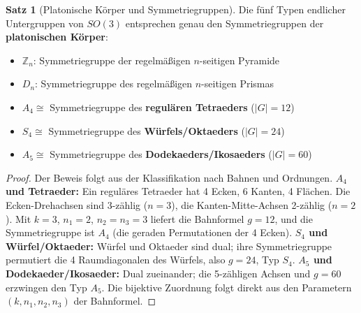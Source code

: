 ﻿\documentclass[a4paper,12pt]{report}
\theoremstyle{definition}
\newtheorem{satz}{Satz}
\begin{document}
\begin{satz}[Platonische Körper und Symmetriegruppen]
    Die fünf Typen endlicher Untergruppen von $SO(3)$ entsprechen
    genau den Symmetriegruppen der \textbf{platonischen Körper}:
    \begin{itemize}
        \item[-] $\mathbb{Z}_n$: Symmetriegruppe der regelmäßigen $n$-seitigen Pyramide
        \item[-] $D_n$: Symmetriegruppe des regelmäßigen $n$-seitigen Prismas
        \item[-] $A_4 \cong$ Symmetriegruppe des \textbf{regulären Tetraeders} ($|G| = 12$)
        \item[-] $S_4 \cong$ Symmetriegruppe des \textbf{Würfels/Oktaeders} ($|G| = 24$)
        \item[-] $A_5 \cong$ Symmetriegruppe des \textbf{Dodekaeders/Ikosaeders} ($|G| = 60$)
    \end{itemize}
\end{satz}
\begin{proof}
    Der Beweis folgt aus der Klassifikation nach Bahnen und Ordnungen.
    \textbf{$A_4$ und Tetraeder:} Ein reguläres Tetraeder hat 4 Ecken, 6 Kanten, 4 Flächen.
    Die Ecken-Drehachsen sind 3-zählig ($n=3$), die Kanten-Mitte-Achsen 2-zählig ($n=2$).
    Mit $k=3$, $n_1=2$, $n_2=n_3=3$ liefert die Bahnformel $g=12$, und die
    Symmetriegruppe ist $A_4$ (die geraden Permutationen der 4 Ecken).
    \textbf{$S_4$ und Würfel/Oktaeder:} Würfel und Oktaeder sind dual; ihre
    Symmetriegruppe permutiert die 4 Raumdiagonalen des Würfels, also $g=24$, Typ $S_4$.
    \textbf{$A_5$ und Dodekaeder/Ikosaeder:} Dual zueinander; die 5-zähligen
    Achsen und $g=60$ erzwingen den Typ $A_5$. Die bijektive Zuordnung
    folgt direkt aus den Parametern $(k, n_1, n_2, n_3)$ der Bahnformel.
\end{proof}
\end{document}
